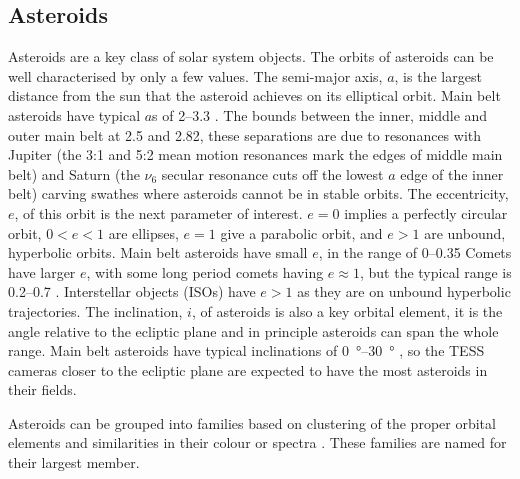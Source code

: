 \documentclass[12pt]{article}
\begin{document}
\subsection{Asteroids}\label{SubSec:Asteroid}

Asteroids are a key class of solar system objects.
The orbits of asteroids can be well characterised by only a few values. The semi-major axis, $a$, is the largest distance from the sun that the asteroid achieves on its elliptical orbit.
Main belt asteroids have typical $a$s of \qtyrange{2}{3.3}{\au} \citet{DeMeo2015}. 
The bounds between the inner, middle and outer main belt at \qty{2.5}{\au} and \qty{2.82}{\au}, these separations are due to resonances with Jupiter (the 3:1 and 5:2 mean motion resonances mark the edges of middle main belt) and Saturn (the $\nu_6$ secular resonance cuts off the lowest $a$ edge of the inner belt) carving swathes where asteroids cannot be in stable orbits. 
The eccentricity, $e$, of this orbit is the next parameter of interest. $e=0$ implies a perfectly circular orbit, $0<e<1$ are ellipses, $e=1$ give a parabolic orbit, and $e>1$ are unbound, hyperbolic orbits.
Main belt asteroids have small $e$, in the range of \qtyrange{0}{0.35}{} \citep{DeMeo2015}
Comets have larger $e$, with some long period comets having $e\approx 1$, but the typical range is \qtyrange{0.2}{0.7}{} \citep{Lewis2012}.
Interstellar objects (ISOs) have $e>1$ as they are on unbound hyperbolic trajectories.
The inclination, $i$, of asteroids is also a key orbital element, it is the angle relative to the ecliptic plane and in principle asteroids can span the whole range. 
Main belt asteroids have typical inclinations of \qtyrange{0}{30}{\degree} \citep{DeMeo2015}, so the TESS cameras closer to the ecliptic plane are expected to have the most asteroids in their fields.


Asteroids can be grouped into families based on clustering of the proper orbital elements and similarities in their colour or spectra \citep{Nesvorny2015}. 
These families are named for their largest member.  

\end{document}
